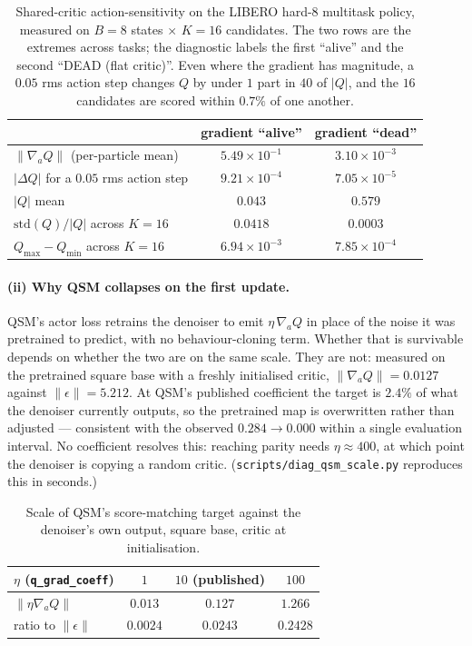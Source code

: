 \begin{table}[h]
\centering
\caption{Shared-critic action-sensitivity on the LIBERO hard-8 multitask
policy, measured on $B{=}8$ states $\times$ $K{=}16$ candidates. The two rows
are the extremes across tasks; the diagnostic labels the first ``alive'' and
the second ``DEAD (flat critic)''. Even where the gradient has magnitude, a
$0.05$ rms action step changes $Q$ by under $1$ part in $40$ of $|Q|$, and the
$16$ candidates are scored within $0.7\%$ of one another.}
\label{tab:critic-diag}
\small
\begin{tabular}{lcc}
\toprule
 & gradient ``alive'' & gradient ``dead'' \\
\midrule
$\|\nabla_a Q\|$ (per-particle mean)      & $5.49\times10^{-1}$ & $3.10\times10^{-3}$ \\
$|\Delta Q|$ for a $0.05$ rms action step & $9.21\times10^{-4}$ & $7.05\times10^{-5}$ \\
$|Q|$ mean                                & $0.043$             & $0.579$ \\
$\mathrm{std}(Q)/|Q|$ across $K{=}16$     & $0.0418$            & $0.0003$ \\
$Q_{\max}-Q_{\min}$ across $K{=}16$       & $6.94\times10^{-3}$ & $7.85\times10^{-4}$ \\
\bottomrule
\end{tabular}
\end{table}

\paragraph{(ii) Why QSM collapses on the first update.}
QSM's actor loss retrains the denoiser to emit $\eta\,\nabla_a Q$ in place of
the noise it was pretrained to predict, with no behaviour-cloning term. Whether
that is survivable depends on whether the two are on the same scale. They are
not: measured on the pretrained square base with a freshly initialised critic,
$\|\nabla_a Q\| = 0.0127$ against $\|\epsilon\| = 5.212$. At QSM's published
coefficient the target is $2.4\%$ of what the denoiser currently outputs, so
the pretrained map is overwritten rather than adjusted --- consistent with the
observed $0.284 \rightarrow 0.000$ within a single evaluation interval. No
coefficient resolves this: reaching parity needs $\eta \approx 400$, at which
point the denoiser is copying a random critic.
(\texttt{scripts/diag\_qsm\_scale.py} reproduces this in seconds.)

\begin{table}[h]
\centering
\caption{Scale of QSM's score-matching target against the denoiser's own
output, square base, critic at initialisation.}
\label{tab:qsm-scale}
\small
\begin{tabular}{lccc}
\toprule
$\eta$ (\texttt{q\_grad\_coeff}) & $1$ & $10$ (published) & $100$ \\
\midrule
$\|\eta \nabla_a Q\|$      & $0.013$  & $0.127$  & $1.266$ \\
ratio to $\|\epsilon\|$    & $0.0024$ & $0.0243$ & $0.2428$ \\
\bottomrule
\end{tabular}
\end{table}

